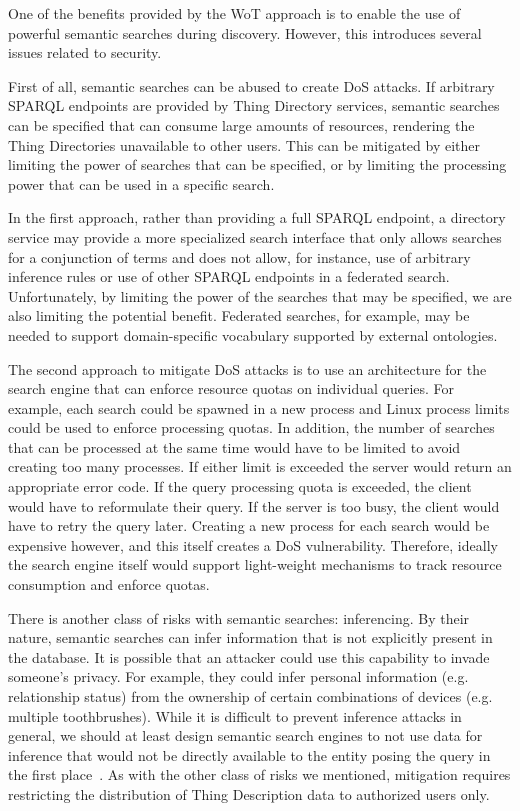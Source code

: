 One of the benefits provided by the WoT approach is to
enable the use of powerful semantic searches during discovery.
However, this introduces several issues related to security.

First of all, semantic searches can be abused to create DoS attacks.
If arbitrary SPARQL endpoints are provided by Thing Directory
services, semantic searches can be specified
that can consume large amounts of resources,
rendering the Thing Directories unavailable to other users.
This can be mitigated by either limiting the power of searches
that can be specified, or by limiting the processing
power that can be used in a specific search.

In the first approach, rather than providing a full
SPARQL endpoint, a directory service may provide a more specialized
search interface that only allows searches for a conjunction of terms
and does not allow, for instance, use of arbitrary inference rules
or use of other SPARQL endpoints in a federated search.
Unfortunately, by limiting the power
of the searches that may be specified, we are also limiting the
potential benefit. Federated searches, for example, may
be needed to support domain-specific vocabulary supported
by external ontologies.

The second approach to mitigate DoS attacks 
is to use an architecture for the 
search engine that can enforce resource quotas on individual queries.
For example, each search could be spawned in a new process and Linux
process limits could be used to enforce processing quotas. In addition,
the number of searches that can be processed at the same time would
have to be limited to avoid creating too many processes.
If either limit is exceeded the server would return an appropriate
error code.  If the query processing quota is exceeded, the client
would have to reformulate their query.  If the server is too busy,
the client would have to retry the query later.
Creating a new process for each search would be expensive however,
and this itself creates a DoS vulnerability.
Therefore, ideally the search engine itself would support light-weight
mechanisms to track resource consumption and enforce quotas.

There is another class of risks with semantic searches: 
inferencing. 
By their nature, semantic searches can infer information that is
not explicitly present in the database.
It is possible that an attacker could use this capability
to invade someone's privacy.  For example, they could infer
personal information (e.g. relationship status) from the ownership
of certain combinations of devices (e.g. multiple toothbrushes).
While it is difficult to prevent inference attacks in general,
we should at least design semantic search engines to not use 
data for inference that would not be directly available to the
entity posing the query in the first place~\cite{Thura2005a,Xia2014a}.  
As with the other class of risks we mentioned,
mitigation requires restricting the distribution of Thing Description
data to authorized users only.

